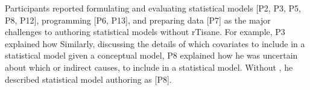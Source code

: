 


Participants reported formulating and evaluating statistical models [P2, P3, P5,
P8, P12], programming [P6, P13], and preparing data [P7] as the major challenges
to authoring statistical models without rTisane. For example, P3 explained how
 Similarly, discussing the details of
which covariates to include in a statistical model given a conceptual model, P8
explained how he was uncertain about which  or
indirect causes, to include in a statistical model. Without \rTisane, he
described statistical model authoring as  [P8].


